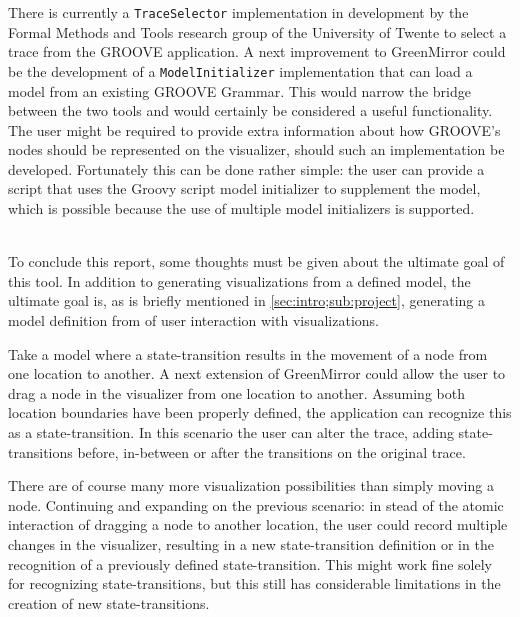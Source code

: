 There is currently a \lstinline{TraceSelector} implementation in development by the Formal Methods and Tools research group of the University of Twente to select a trace from the GROOVE application. A next improvement to GreenMirror could be the development of a \lstinline{ModelInitializer} implementation that can load a model from an existing GROOVE Grammar. This would narrow the bridge between the two tools and would certainly be considered a useful functionality. The user might be required to provide extra information about how GROOVE’s nodes should be represented on the visualizer, should such an implementation be developed. Fortunately this can be done rather simple: the user can provide a script that uses the Groovy script model initializer to supplement the model, which is possible because the use of multiple model initializers is supported. 
\\\\\par
To conclude this report, some thoughts must be given about the ultimate goal of this tool. In addition to generating visualizations from a defined model, the ultimate goal is, as is briefly mentioned in \cref{sec:intro;sub:project}, generating a model definition from of user interaction with visualizations.

Take a model where a state-transition results in the movement of a node from one location to another. A next extension of GreenMirror could allow the user to drag a node in the visualizer from one location to another. Assuming both location boundaries have been properly defined, the application can recognize this as a state-transition. In this scenario the user can alter the trace, adding state-transitions before, in-between or after the transitions on the original trace.

There are of course many more visualization possibilities than simply moving a node. Continuing and expanding on the previous scenario: in stead of the atomic interaction of dragging a node to another location, the user could record multiple changes in the visualizer, resulting in a new state-transition definition or in the recognition of a previously defined state-transition. This might work fine solely for recognizing state-transitions, but this still has considerable limitations in the creation of new state-transitions.

